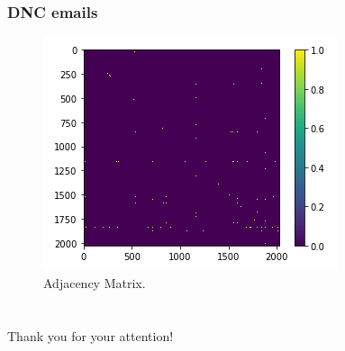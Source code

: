\documentclass{beamer}
\theoremstyle{plain}
\theoremstyle{definition}
\theoremstyle{remark}
\begin{document}
\begin{frame}
\frametitle{DNC emails}

\begin{figure}
	\includegraphics[height=0.75\textheight,keepaspectratio]{figures/ad_mat_snapshot}
	\caption{Adjacency Matrix.}
\end{figure}
\end{frame}

\section*{}
\begin{frame}

\centering
\Huge{Thank you for your attention!}

\end{frame}

\end{document}
